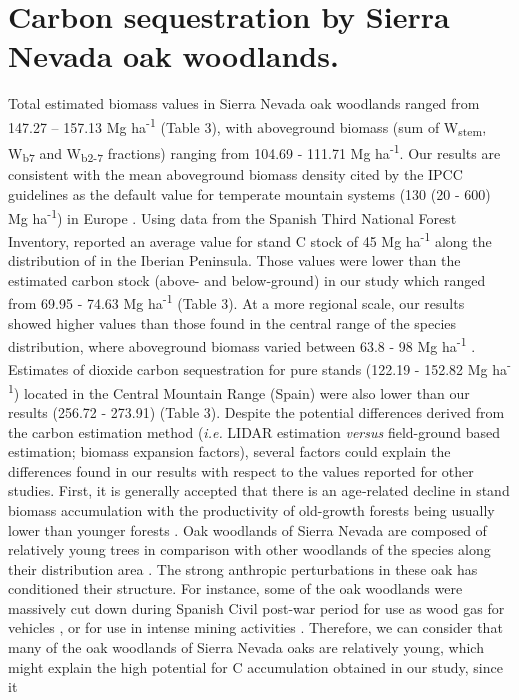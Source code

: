 \section{Carbon sequestration by Sierra Nevada oak woodlands.}\label{sec:carbon:discussion-sn}

Total estimated biomass values in Sierra Nevada oak woodlands ranged from 147.27 -- 157.13 Mg ha\textsuperscript{-1} (Table 3), with aboveground biomass (sum of W\textsubscript{stem}, W\textsubscript{b7} and W\textsubscript{b2-7} fractions) ranging from 104.69 - 111.71 Mg ha\textsuperscript{-1}. Our results are consistent with the mean aboveground biomass density cited by the IPCC guidelines as the default value for temperate mountain systems (130 (20 - 600) Mg ha\textsuperscript{-1}) in Europe \autocite{IPCC2006ForestLand}. Using data from the Spanish Third National Forest Inventory, \autocite{Vayredaetal2012SpatialPatterns} reported an average value for stand C stock of 45 Mg ha\textsuperscript{-1} along the distribution of \Qp in the Iberian Peninsula. Those values were lower than the estimated carbon stock (above- and below-ground) in our study which ranged from 69.95 - 74.63 Mg ha\textsuperscript{-1} (Table 3). At a more regional scale, our results showed higher values than those found in the central range of the species distribution, where aboveground biomass varied between 63.8 - 98 Mg ha\textsuperscript{-1} \autocite{GallardoLanchoGonzalezHernandez2004SequestrationCarbon}. Estimates of dioxide carbon sequestration for \Qp pure stands (122.19 - 152.82 Mg ha\textsuperscript{-1}) located in the Central Mountain Range (Spain) \autocite{Canellasetal2008SilvicultureCarbon,Canellasetal2017CarbonSequestration} were also lower than our results (256.72 - 273.91) (Table 3). Despite the potential differences derived from the carbon estimation method (\emph{i.e.} LIDAR estimation \emph{versus} field-ground based estimation; biomass expansion factors), several factors could explain the differences found in our results with respect to the values reported for other studies. First, it is generally accepted that there is an age‐related decline in stand biomass accumulation \autocite[ and references therein]{Xuetal2012AgerelatedDecline} with the productivity of old-growth forests being usually lower than younger forests \autocite{Kutschetal2009EcophysiologicalCharacteristics}. Oak woodlands of Sierra Nevada are composed of relatively young trees \autocite{GeaIzquierdoCanellas2014LocalClimate,PerezLuqueetal2020LanduseLegacies,RubioCuadradoetal2018AbioticFactors} in comparison with other woodlands of the species along their distribution area \autocite{GeaIzquierdoCanellas2014LocalClimate}. The strong anthropic perturbations in these oak has conditioned their structure. For instance, some of the oak woodlands were massively cut down during Spanish Civil post-war period for use as wood gas for vehicles \autocite[\emph{e.g.} MON population;][]{Prieto1975BosquesSierra}, or for use in intense mining activities \autocite[\emph{e.g.} GEN population;][]{PerezLuqueetal2020LanduseLegacies}. Therefore, we can consider that many of the oak woodlands of Sierra Nevada oaks are relatively young, which might explain the high potential for C accumulation obtained in our study, since it 